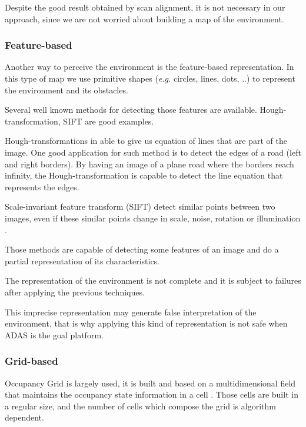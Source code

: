 Despite the good result obtained by scan alignment, it is not necessary in our approach, since we are not worried about building a map of the environment. 

\subsubsection{Feature-based}

Another way to perceive the environment is the feature-based representation. In this type of map we use primitive shapes (\textit{e.g.} circles, lines, dots, ..) to represent the environment and its obstacles.

Several well known methods for detecting those features are available. Hough-transformation, SIFT are good examples. 

Hough-transformations in able to give us equation of lines that are part of the image. One good application for such method is to detect the edges of a road (left and right borders). By having an image of a plane road where the borders reach infinity, the Hough-transformation is capable to detect the line equation that represents the edges. \cite{Ballard:1987:GHT:33517.33574}

Scale-invariant feature transform (SIFT) detect similar points between two images, even if these similar points change in scale, noise, rotation or illumination \cite{Lowe:1999:ORL:850924.851523}.

Those methods are capable of detecting some features of an image and do a partial representation of its characteristics. 

The representation of the environment is not complete and it is subject to failures after applying the previous techniques.

This imprecise representation may generate false interpretation of the environment, that is why applying this kind of representation is not safe when ADAS is the goal platform.

\subsubsection{Grid-based}
\label{ch02:gridbased}

Occupancy Grid is largely used, it is built and based on a multidimensional field that maintains the occupancy state information in a cell \cite{Elfes:1989:UOG:68491.68495}. Those cells are built in a regular size, and the number of cells which compose the grid is algorithm dependent.

